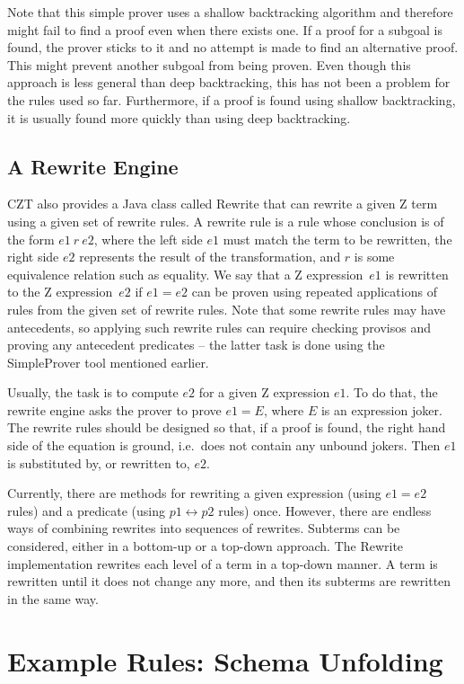 \documentclass{entcs}
\begin{document}
Note that this simple prover uses a shallow backtracking algorithm and
therefore might fail to find a proof even when there exists one.  If a
proof for a subgoal is found, the prover sticks to it and no attempt
is made to find an alternative proof.  This might prevent another
subgoal from being proven.  Even though this approach is less general
than deep backtracking, this has not been a problem for the rules used
so far.  Furthermore, if a proof is found using shallow backtracking,
it is usually found more quickly than using deep backtracking.

\subsection{A Rewrite Engine}

CZT also provides a Java class called Rewrite that can rewrite a given
Z term using a given set of rewrite rules.  A rewrite rule is a rule
whose conclusion is of the form $e1~r~e2$, where the left side $e1$
must match the term to be rewritten, the right side $e2$ represents
the result of the transformation, and $r$ is some equivalence relation
such as equality.  We say that a Z expression~$e1$ is rewritten to the
Z expression~$e2$ if $e1 = e2$ can be proven using repeated
applications of rules from the given set of rewrite rules.  Note that
some rewrite rules may have antecedents, so applying such rewrite
rules can require checking provisos and proving any antecedent
predicates -- the latter task is done using the SimpleProver tool
mentioned earlier.

Usually, the task is to compute $e2$ for a given Z expression $e1$.
To do that, the rewrite engine asks the prover to prove $e1 = E$,
where $E$ is an expression joker.  The rewrite rules should be
designed so that, if a proof is found, the right hand side of the
equation is ground, i.e.\ does not contain any unbound jokers.  Then
$e1$ is substituted by, or rewritten to, $e2$.

Currently, there are methods for rewriting a given expression (using
$e1 = e2$ rules) and a predicate (using $p1 \leftrightarrow p2$ rules)
once.  However, there are endless ways of combining rewrites into
sequences of rewrites.  Subterms can be considered, either in a
bottom-up or a top-down approach.  The Rewrite implementation rewrites
each level of a term in a top-down manner.  A term is rewritten until
it does not change any more, and then its subterms are rewritten in
the same way.


\section{Example Rules: Schema Unfolding} \label{sec:schemas}
\end{document}
